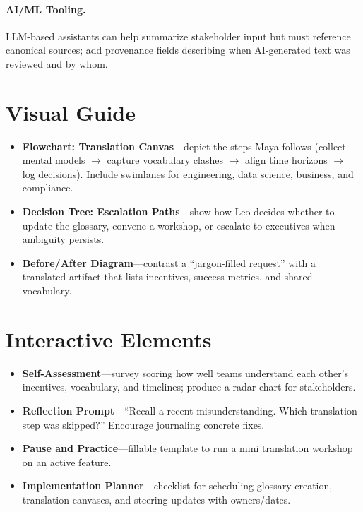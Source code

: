 \paragraph{AI/ML Tooling.} LLM-based assistants can help summarize stakeholder input but must reference canonical sources; add provenance fields describing when AI-generated text was reviewed and by whom.
\section{Visual Guide}
\label{sec:translation-visuals}
\begin{itemize}
    \item \textbf{Flowchart: Translation Canvas}—depict the steps Maya follows (collect mental models $\rightarrow$ capture vocabulary clashes $\rightarrow$ align time horizons $\rightarrow$ log decisions). Include swimlanes for engineering, data science, business, and compliance.
    \item \textbf{Decision Tree: Escalation Paths}—show how Leo decides whether to update the glossary, convene a workshop, or escalate to executives when ambiguity persists.
    \item \textbf{Before/After Diagram}—contrast a ``jargon-filled request'' with a translated artifact that lists incentives, success metrics, and shared vocabulary.
\end{itemize}

\section{Interactive Elements}
\label{sec:translation-interactive}
\begin{itemize}
    \item \textbf{Self-Assessment}—survey scoring how well teams understand each other's incentives, vocabulary, and timelines; produce a radar chart for stakeholders.
    \item \textbf{Reflection Prompt}—``Recall a recent misunderstanding. Which translation step was skipped?'' Encourage journaling concrete fixes.
    \item \textbf{Pause and Practice}—fillable template to run a mini translation workshop on an active feature.
    \item \textbf{Implementation Planner}—checklist for scheduling glossary creation, translation canvases, and steering updates with owners/dates.
\end{itemize}
